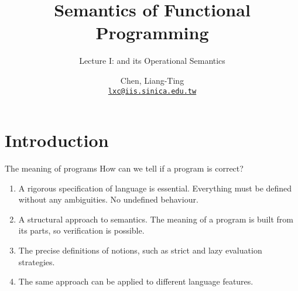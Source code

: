 \title{Semantics of Functional Programming}
\subtitle{Lecture I: \PCF{} and its Operational Semantics}
\author[L.-T. Chen]{Chen, Liang-Ting\\
  \href{mailto:lxc@iis.sinica.edu.tw}{\texttt{lxc@iis.sinica.edu.tw}}}


\setcounter{framenumber}{-1}

\frame{\maketitle}
\section{Introduction}

\begin{frame}{The meaning of programs}
  How can we tell if a program is correct? 
  \begin{enumerate}
    \item A rigorous specification of language is essential. Everything must be
      defined without any ambiguities. No undefined behaviour. 
    \item A structural approach to semantics. The meaning of a program is
      built from its parts, so verification is possible. 
    \item The precise definitions of notions, such as strict and lazy
      evaluation strategies. 
    \item The same approach can be applied to different language features.
  \end{enumerate}
\end{frame}

